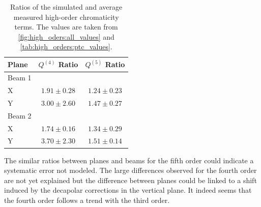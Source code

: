 \begin{table}[!htb]
    \centering
    \begin{tabular}{lcc}
      \toprule
        Plane         & $Q^{(4)}$ Ratio&  $Q^{(5)}$ Ratio \\
      \midrule
        Beam 1        &                &                  \\
        \hspace{2mm}X &  $1.91\pm0.28$ & $1.24\pm0.23$    \\
        \hspace{2mm}Y &  $3.00\pm2.60$ & $1.47\pm0.27$    \\
        Beam 2        &                &                  \\
        \hspace{2mm}X &  $1.74\pm0.16$ & $1.34\pm0.29$    \\
        \hspace{2mm}Y &  $3.70\pm2.30$ & $1.51\pm0.14$    \\
        \bottomrule
    \end{tabular}
    \caption{Ratios of the simulated and average measured high-order chromaticity terms.  The values
    are taken from \cref{fig:high_oders:all_values} and \cref{tab:high_orders:ptc_values}.}
    \label{tab:high_orders:ptc_values_ratios}
\end{table}

The similar ratios between planes and beams for the fifth order could indicate a systematic error
not modeled.
The large differences observed for the fourth order are not yet explained but the difference between
planes could be linked to a shift induced by the decapolar corrections in the vertical plane. It
indeed seems that the fourth order follows a trend with the third order.
